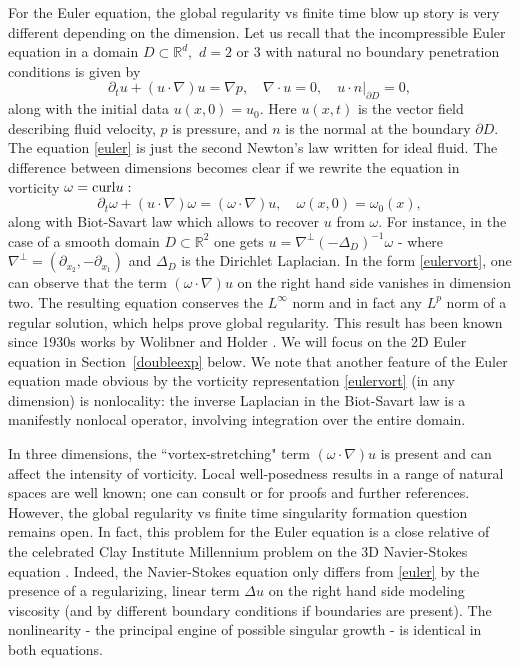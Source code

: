 \documentclass[reqno,centertags, 11pt]{amsart}
\def \Rm {\mathbb R}
\begin{document}
For the Euler equation, the global regularity vs finite time blow up story is very different depending on the dimension. Let us recall that the
incompressible Euler equation in a domain $D \subset \Rm^d,$ $d=2$ or $3$ with natural no boundary penetration conditions is given by
\begin{equation}\label{euler}
\left. \partial_t u + (u \cdot \nabla) u = \nabla p, \,\,\,\,\,\,\nabla \cdot u =0,\,\,\,\,\,\,u \cdot n \right|_{\partial D}=0,
\end{equation}
along with the initial data $u(x,0)=u_0.$ Here $u(x,t)$ is the vector field describing fluid velocity, $p$ is pressure, and $n$ is the normal at the boundary $\partial D.$ The equation \eqref{euler} is just the second Newton's law written for ideal fluid.
The difference between dimensions becomes clear if we rewrite the
equation in vorticity $\omega = {\rm curl} u:$
\begin{equation}\label{eulervort}
\partial_t \omega +(u \cdot \nabla) \omega = (\omega \cdot \nabla) u,\,\,\,\,\,\,\omega(x,0)=\omega_0(x),
\end{equation}
along with Biot-Savart law which allows to recover $u$ from $\omega.$ For instance, in the case of a smooth domain $D \subset \Rm^2$ one gets $u = \nabla^\perp (-\Delta_D)^{-1}\omega$ -
where $\nabla^\perp = (\partial_{x_2}, -\partial_{x_1})$ and $\Delta_D$ is the Dirichlet Laplacian.
In the form \eqref{eulervort}, one can observe that the term $(\omega \cdot \nabla) u$ on the right hand side vanishes in dimension two.
The resulting equation conserves the
$L^\infty$ norm and in fact any $L^p$ norm of a regular solution, which helps prove global regularity. This result has been known since 1930s works
by Wolibner \cite{Wolibner} and Holder \cite{Holder}. We will focus on the 2D Euler equation in Section~\ref{doubleexp} below.
We note that another feature of the Euler equation made obvious by the vorticity representation \eqref{eulervort} (in any dimension) is nonlocality:
the inverse Laplacian in the Biot-Savart law is a manifestly nonlocal operator, involving integration over the entire domain.

In three dimensions, the ``vortex-stretching" term $(\omega \cdot \nabla) u$ is present and can affect the intensity of vorticity.
Local well-posedness results in a range of natural spaces are well known; one can consult \cite{MB} or \cite{MP} for proofs and further references.
However, the global regularity vs finite time singularity formation question remains open. In fact, this problem for the Euler equation is a close
relative of the celebrated Clay Institute Millennium problem on the 3D Navier-Stokes equation \cite{Feff}. Indeed, the Navier-Stokes equation only differs from
\eqref{euler} by the presence of a regularizing, linear term $\Delta u$ on the right hand side modeling viscosity (and by different boundary conditions
if boundaries are present). The nonlinearity - the principal engine of possible singular growth - is identical in both equations.
\end{document}

